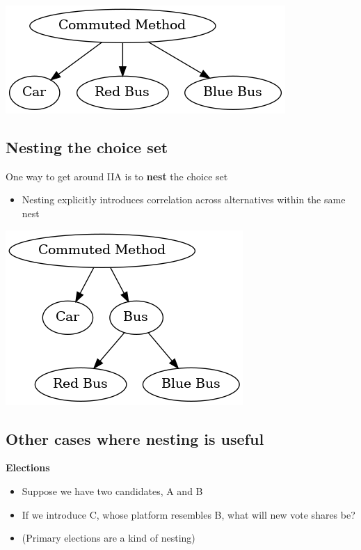 \documentclass[11pt]{article}
\begin{document}
\begin{center}
\includegraphics[width=.9\linewidth]{unnested.png}
\end{center}


\subsection{Nesting the choice set}
\label{sec:org2ce3071}
One way to get around IIA is to \textbf{nest} the choice set
\begin{itemize}
\item Nesting explicitly introduces correlation across alternatives within the same nest
\end{itemize}


\begin{center}
\includegraphics[width=.9\linewidth]{nested.png}
\end{center}


\subsection{Other cases where nesting is useful}
\label{sec:orgca357d3}

\textbf{Elections}

\begin{itemize}
\item Suppose we have two candidates, A and B
\item If we introduce C, whose platform resembles B, what will new vote shares be?
\item (Primary elections are a kind of nesting)
\end{itemize}
\end{document}
